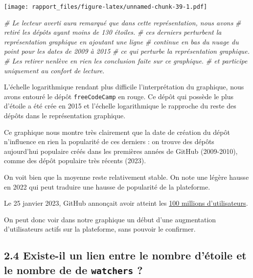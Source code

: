 \documentclass[
]{article}
\newenvironment{Shaded}{\begin{snugshade}}{\end{snugshade}}
\newcommand{\CommentTok}[1]{\textcolor[rgb]{0.56,0.35,0.01}{\textit{#1}}}
\begin{document}
\texttt{[image: rapport\_files/figure-latex/unnamed-chunk-39-1.pdf]}

\begin{Shaded}
\begin{Highlighting}[]
\CommentTok{\# Le lecteur averti aura remarqué que dans cette représentation, nous avons}
\CommentTok{\# retiré les dépôts ayant moins de 130 étoiles.}
\CommentTok{\# ces derniers perturbent la représentation graphique en ajoutant une ligne }
\CommentTok{\# continue en bas du nuage du point pour les dates de 2009 à 2015}
\CommentTok{\# ce qui perturbe la représentation graphique.}
\CommentTok{\# Les retirer n\textquotesingle{}enlève en rien les conclusion faite sur ce graphique.}
\CommentTok{\# et participe uniquement au confort de lecture.}
\end{Highlighting}
\end{Shaded}

L'échelle logarithmique rendant plus difficile l'interprétation du
graphique, nous avons entouré le dépôt \texttt{freeCodeCamp} en rouge.
Ce dépôt qui possède le plus d'étoile a été crée en 2015 et l'échelle
logarithmique le rapproche du reste des dépôts dans le représentation
graphique.

Ce graphique nous montre très clairement que la date de création du
dépôt n'influence en rien la popularité de ces derniers : on trouve des
dépôts aujourd'hui populaire créés dans les premières années de GitHub
(2009-2010), comme des dépôt populaire très récents (2023).

On voit bien que la moyenne reste relativement stable. On note une
légère hausse en 2022 qui peut traduire une hausse de popularité de la
plateforme.

Le 25 janvier 2023, GitHub annonçait avoir atteint les
\href{https://github.blog/2023-01-25-100-million-developers-and-counting/}{100
millions d'utilisateurs}.

On peut donc voir dans notre graphique un début d'une augmentation
d'utilisateurs actifs sur la plateforme, sans pouvoir le confirmer.

\subsection{\texorpdfstring{2.4 Existe-il un lien entre le nombre
d'étoile et le nombre de de \texttt{watchers}
?}{2.4 Existe-il un lien entre le nombre d'étoile et le nombre de de watchers ?}}\label{existe-il-un-lien-entre-le-nombre-duxe9toile-et-le-nombre-de-de-watchers}
\end{document}
